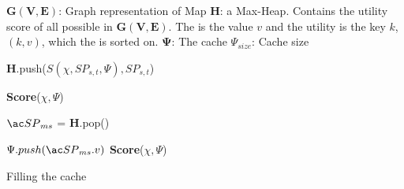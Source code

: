 
\begin{algorithm}[H!bt]
\dontprintsemicolon
\SetVline


\KwData
{

	$\mathbf{G(V,E)}$: Graph representation of Map \;
	\textbf{H}: a Max-Heap. Contains the utility score of all possible \spaths in $\mathbf{G(V,E)}$. The \spath is the value $v$ and the utility is the key $k$, $(k, v)$, which the is sorted on.\;
	$\mathbf{\Psi}$: The cache \;
	$\Psi_{size}$: Cache size \;
}

{
	{
		\textbf{H}.push($S(\chi, SP_{s,t}, \Psi), SP_{s,t}$) \;
	}
}

\textbf{Score}($\chi, \Psi$) \;

{
	$\spath_{ms}$ = \textbf{H}.pop() \; 
	{
		$\Psi.push(\spath_{ms}.v)$\;
		\textbf{Score}($\chi, \Psi$) \;
		
	}
}

\caption{Filling the cache}
\label{alg:greedy}
\end{algorithm}